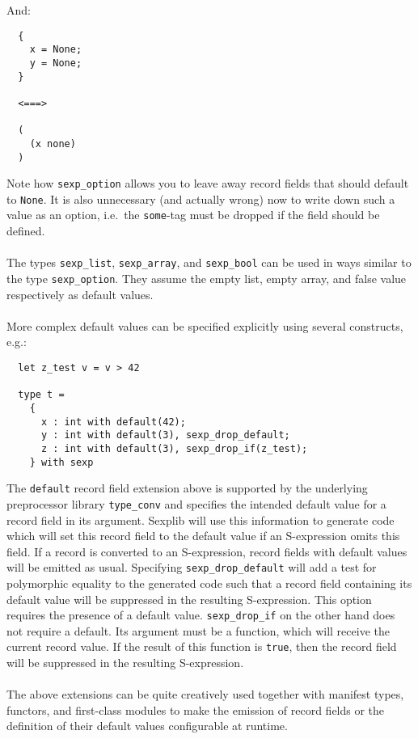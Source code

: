 \documentclass[a4paper]{article}
\begin{document}
\noindent And:

{\samepage
\begin{verbatim}
  {
    x = None;
    y = None;
  }

  <===>

  (
    (x none)
  )
\end{verbatim}
}

Note how \verb=sexp_option= allows you to leave away record fields
that should default to \verb=None=.  It is also unnecessary (and
actually wrong) now to write down such a value as an option, i.e.\
the \verb=some=-tag must be dropped if the field should be defined.\\
\\
The types \verb=sexp_list=, \verb=sexp_array=, and \verb=sexp_bool= can be
used in ways similar to the type \verb=sexp_option=.  They assume the empty
list, empty array, and false value respectively as default values.\\
\\
More complex default values can be specified explicitly using several
constructs, e.g.:

\begin{verbatim}
  let z_test v = v > 42

  type t =
    {
      x : int with default(42);
      y : int with default(3), sexp_drop_default;
      z : int with default(3), sexp_drop_if(z_test);
    } with sexp
\end{verbatim}

\noindent The \verb=default= record field extension above is supported by the
underlying preprocessor library \verb=type_conv= and specifies the intended
default value for a record field in its argument.  Sexplib will use this
information to generate code which will set this record field to the default
value if an S-expression omits this field.  If a record is converted to an
S-expression, record fields with default values will be emitted as usual.
Specifying \verb=sexp_drop_default= will add a test for polymorphic equality
to the generated code such that a record field containing its default value
will be suppressed in the resulting S-expression.  This option requires the
presence of a default value.  \verb=sexp_drop_if= on the other hand does
not require a default.  Its argument must be a function, which will receive
the current record value.  If the result of this function is \verb=true=,
then the record field will be suppressed in the resulting S-expression.\\
\\
The above extensions can be quite creatively used together with manifest
types, functors, and first-class modules to make the emission of record
fields or the definition of their default values configurable at runtime.
\end{document}
